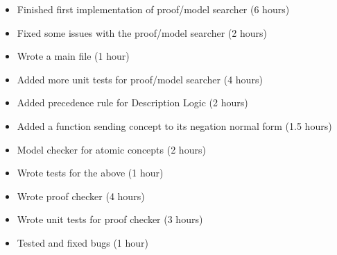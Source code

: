 %
{ \begin{itemize} 
  \item Finished first implementation of proof/model searcher (6 hours)
  \item Fixed some issues with the proof/model searcher (2 hours)
  \item Wrote a main file (1 hour)
 \end{itemize} 
}%
{ \begin{itemize} 
 \item Added more unit tests for proof/model searcher (4 hours)
 \end{itemize} 
}%
{ \begin{itemize} 
  \item Added precedence rule for Description Logic (2 hours)
  \item Added a function sending concept to its negation normal form (1.5 hours)
  \item Model checker for atomic concepts (2 hours)
  \item Wrote tests for the above (1 hour)
 \end{itemize} 
}%
{ \begin{itemize} 
  \item Wrote proof checker  (4 hours)
  \item Wrote unit tests for proof checker  (3 hours)
  \item Tested and fixed bugs (1 hour)
 \end{itemize} 
}%

